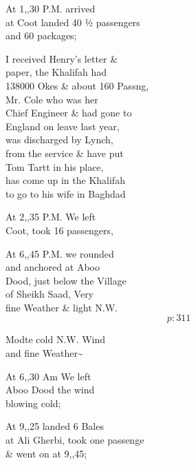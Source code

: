 \documentclass{report}
\begin{document}
	\par{
 	At 1,,30 P.M. arrived\ \\at Coot landed 40 ½ passengers\ \\and 60 packages;\ \\
	}

	\par{
 	I received Henry’s letter \&\ \\paper, the Khalifah had\ \\138000 Okes \& about 160 Passng,\ \\Mr. Cole who was her\ \\Chief Engineer \& had gone to\ \\England on leave last year,\ \\was discharged by Lynch,\ \\from the service \& have put\ \\Tom Tartt in his place,\ \\has come up in the Khalifah\ \\to go to his wife in Baghdad\ \\
	}

	\par{
 	At 2,,35 P.M. We left\ \\Coot, took 16 passengers,\ \\
	}

	\par{
 	At 6,,45 P.M. we rounded\ \\and anchored at Aboo\ \\Dood, just below the Village\ \\of Sheikh Saad, Very\ \\fine Weather \& light N.W.\ \\
  \[p: 311 \]

	}


	\par{
 	Modte cold N.W. Wind\ \\and fine Weather\~{}\ \\
	}

	\par{
 	At 6,,30 Am We left\ \\Aboo Dood the wind\ \\blowing cold;\ \\
	}

	\par{
 	At 9,,25 landed 6 Bales\ \\at Ali Gherbi, took one passenge\ \\\& went on at 9,,45;\ \\
	}
\end{document}
